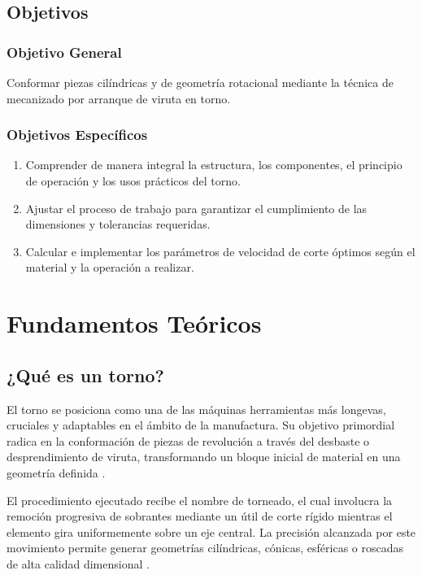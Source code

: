 \documentclass[12pt,a4paper]{article}
\begin{document}
\subsection{Objetivos}

\subsubsection{Objetivo General}
Conformar piezas cilíndricas y de geometría rotacional mediante la técnica de mecanizado por arranque de viruta en torno.

\subsubsection{Objetivos Específicos}
\begin{enumerate}[itemsep=2pt, topsep=2pt, parsep=0pt]
    \item Comprender de manera integral la estructura, los componentes, el principio de operación y los usos prácticos del torno.
    \item Ajustar el proceso de trabajo para garantizar el cumplimiento de las dimensiones y tolerancias requeridas.
    \item Calcular e implementar los parámetros de velocidad de corte óptimos según el material y la operación a realizar.
\end{enumerate}

\clearpage
\noindent{\color{utablue!30}\rule{\textwidth}{0.5pt}}
\vspace{2pt}
\section{Fundamentos Teóricos}
\label{sec:fundamentos}

\subsection{¿Qué es un torno?}
El torno se posiciona como una de las máquinas herramientas más longevas, cruciales y adaptables en el ámbito de la manufactura. Su objetivo primordial radica en la conformación de piezas de revolución a través del desbaste o desprendimiento de viruta, transformando un bloque inicial de material en una geometría definida \cite{groover2020}.

El procedimiento ejecutado recibe el nombre de torneado, el cual involucra la remoción progresiva de sobrantes mediante un útil de corte rígido mientras el elemento gira uniformemente sobre un eje central. La precisión alcanzada por este movimiento permite generar geometrías cilíndricas, cónicas, esféricas o roscadas de alta calidad dimensional \cite{kalpakjian2020}.
\end{document}

